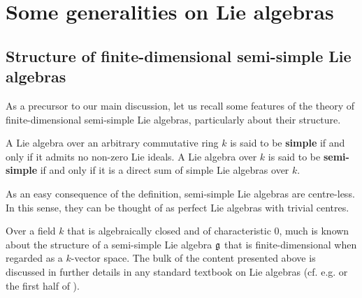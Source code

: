 \section{Some generalities on Lie algebras}
    \subsection{Structure of finite-dimensional semi-simple Lie algebras}
        As a precursor to our main discussion, let us recall some features of the theory of finite-dimensional semi-simple Lie algebras, particularly about their structure.

        \begin{definition}
            A Lie algebra over an arbitrary commutative ring $k$ is said to be \textbf{simple} if and only if it admits no non-zero Lie ideals. A Lie algebra over $k$ is said to be \textbf{semi-simple} if and only if it is a direct sum of simple Lie algebras over $k$. 
        \end{definition}
        \begin{remark}
            As an easy consequence of the definition, semi-simple Lie algebras are centre-less. In this sense, they can be thought of as perfect Lie algebras with trivial centres. 
        \end{remark}

        Over a field $k$ that is algebraically closed and of characteristic $0$, much is known about the structure of a semi-simple Lie algebra $\mathfrak{g}$ that is finite-dimensional when regarded as a $k$-vector space. The bulk of the content presented above is discussed in further details in any standard textbook on Lie algebras (cf. e.g. \cite{humphreys_lie_algebras} or the first half of \cite{carter_affine_lie_algebras}).


